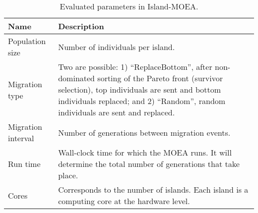 %
%

\begin{table}[H]
    \caption[Evaluated parameters in Island-MOEA]{Evaluated parameters in Island-MOEA.}
    \centering
    \begin{tabular}{lp{13cm}}
        \toprule
        Name                & Description   \\
        \midrule
        Population size     & Number of individuals per island.  \\
        Migration type      & Two are possible: 1) ``ReplaceBottom'', after non-dominated sorting of the Pareto front\citep{deb2002} (survivor selection), top individuals are sent and bottom individuals replaced; and 2) ``Random'', random individuals are sent and replaced.  \\
        Migration interval  & Number of generations between migration events.    \\
        Run time            & Wall-clock time for which the MOEA runs. It will determine the total number of generations that take place.   \\
        Cores               & Corresponds to the number of islands. Each island is a computing core at the hardware level. \\
        \hline
    \end{tabular}
    \label{tab7:parameters}
\end{table}

